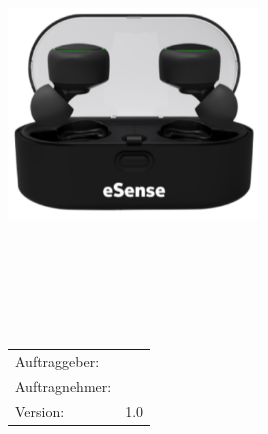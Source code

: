\begin{titlepage}
\maketitle
\thispagestyle{empty} %

\begin{verbatim}






	




\end{verbatim}
\begin{center}
\includegraphics[width=0.5\textwidth]{EarablesBild.PNG}
\end{center}
\begin{verbatim}






\end{verbatim}


  \begin{tabular}[t]{p{4 cm}p{8 cm}}
	Auftraggeber:  & \auftraggeber\\[1.2ex]
	Auftragnehmer: & \auftragnehmer\\[1.2ex]
	Version:       & 1.0\\[1.2ex]
  \end{tabular}


\end{titlepage}
